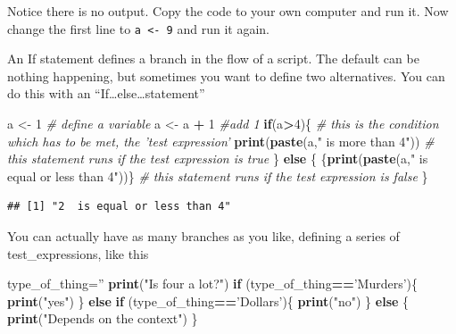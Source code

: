 \documentclass[]{book}
\newenvironment{Shaded}{\begin{snugshade}}{\end{snugshade}}
\newcommand{\KeywordTok}[1]{\textcolor[rgb]{0.13,0.29,0.53}{\textbf{#1}}}
\newcommand{\DecValTok}[1]{\textcolor[rgb]{0.00,0.00,0.81}{#1}}
\newcommand{\StringTok}[1]{\textcolor[rgb]{0.31,0.60,0.02}{#1}}
\newcommand{\CommentTok}[1]{\textcolor[rgb]{0.56,0.35,0.01}{\textit{#1}}}
\newcommand{\ControlFlowTok}[1]{\textcolor[rgb]{0.13,0.29,0.53}{\textbf{#1}}}
\newcommand{\OperatorTok}[1]{\textcolor[rgb]{0.81,0.36,0.00}{\textbf{#1}}}
\newcommand{\NormalTok}[1]{#1}
\begin{document}
Notice there is no output. Copy the code to your own computer and run
it. Now change the first line to \texttt{a\ \textless{}-\ 9} and run it
again.

An If statement defines a branch in the flow of a script. The default
can be nothing happening, but sometimes you want to define two
alternatives. You can do this with an
``If\ldots{}else\ldots{}statement''

\begin{Shaded}
\begin{Highlighting}[]
\NormalTok{a <-}\StringTok{ }\DecValTok{1} \CommentTok{# define a variable}
\NormalTok{a <-}\StringTok{ }\NormalTok{a }\OperatorTok{+}\StringTok{ }\DecValTok{1} \CommentTok{#add 1}
\ControlFlowTok{if}\NormalTok{(a}\OperatorTok{>}\DecValTok{4}\NormalTok{)\{ }\CommentTok{# this is the condition which has to be met, the 'test expression'}
  \KeywordTok{print}\NormalTok{(}\KeywordTok{paste}\NormalTok{(a,}\StringTok{" is more than 4"}\NormalTok{)) }\CommentTok{# this statement runs if the test expression is true}
\NormalTok{\} }\ControlFlowTok{else}\NormalTok{ \{}
\NormalTok{  \{}\KeywordTok{print}\NormalTok{(}\KeywordTok{paste}\NormalTok{(a,}\StringTok{" is equal or less than 4"}\NormalTok{))\} }\CommentTok{# this statement runs if the test expression is false}
\NormalTok{\}}
\end{Highlighting}
\end{Shaded}

\begin{verbatim}
## [1] "2  is equal or less than 4"
\end{verbatim}

You can actually have as many branches as you like, defining a series of
test\_expressions, like this

\begin{Shaded}
\begin{Highlighting}[]
\NormalTok{type_of_thing=}\StringTok{''} 
\KeywordTok{print}\NormalTok{(}\StringTok{"Is four a lot?"}\NormalTok{)}
\ControlFlowTok{if}\NormalTok{ (type_of_thing}\OperatorTok{==}\StringTok{'Murders'}\NormalTok{)\{}
  \KeywordTok{print}\NormalTok{(}\StringTok{"yes"}\NormalTok{)}
\NormalTok{\} }\ControlFlowTok{else} \ControlFlowTok{if}\NormalTok{ (type_of_thing}\OperatorTok{==}\StringTok{'Dollars'}\NormalTok{)\{}
  \KeywordTok{print}\NormalTok{(}\StringTok{"no"}\NormalTok{)}
\NormalTok{\} }\ControlFlowTok{else}\NormalTok{ \{}
  \KeywordTok{print}\NormalTok{(}\StringTok{"Depends on the context"}\NormalTok{)}
\NormalTok{\}}
\end{Highlighting}
\end{Shaded}
\end{document}
